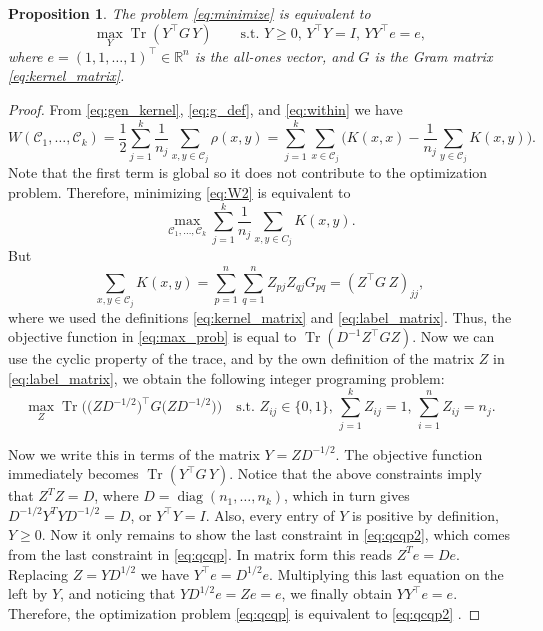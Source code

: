 \documentclass[aps,preprint,nofootinbib,floatfix]{revtex4-1}
\newtheorem{proposition}[theorem]{Proposition}
\DeclareMathOperator{\diag}{diag}
\DeclareMathOperator{\Tr}{Tr}
\newcommand\kk{K}
\newcommand\C{{\mathcal{C}}}
\newcommand\Zt{Y}
\newcommand\e{e}
\begin{document}
\begin{proposition} 
\label{th:qcqp2}
The problem \eqref{eq:minimize} is equivalent to
\begin{equation}
\label{eq:qcqp2}
\max_{\Zt} \Tr \left( \Zt^\top G \, \Zt \right)  \qquad
\mbox{s.t. $\Zt \ge 0$, $\Zt^\top \Zt = I$, 
$\Zt \Zt^\top \e = \e$},
\end{equation}
where $\e = (1,1,\dots,1)^\top \in \mathbb{R}^n$ is the all-ones vector,
and $G$ is the Gram matrix \eqref{eq:kernel_matrix}.
\end{proposition}
\begin{proof}
From 
\eqref{eq:gen_kernel},
\eqref{eq:g_def}, and
\eqref{eq:within}
we have
\begin{equation}
\label{eq:W2}
W(\C_1,\dotsc,\C_k  )
= \dfrac{1}{2} \sum_{j=1}^k \dfrac{1}{n_j} \sum_{x,y \in \C_j} \rho(x,y)
= \sum_{j=1}^k \sum_{x \in \C_j}  \bigg(
\kk(x,x) - \dfrac{1}{n_j} \sum_{y \in \C_j} \kk(x,y) \bigg).
\end{equation}
Note that the first term is global so it does not contribute to the 
optimization problem.
Therefore, minimizing \eqref{eq:W2} is equivalent to
\begin{equation}
\label{eq:max_prob}
\max_{ \C_1,\dotsc,\C_k } 
\sum_{j=1}^k \dfrac{1}{n_j} \sum_{x,y\in C_j} \kk(x,y) .
\end{equation}
But 
\begin{equation}
\sum_{x, y \in \C_j} \kk(x, y) =
\sum_{p=1}^{n} \sum_{q=1}^{n} Z_{pj} Z_{qj} G_{pq} = 
(Z^\top G \, Z)_{jj},
\end{equation}
where we used the definitions \eqref{eq:kernel_matrix} and
\eqref{eq:label_matrix}. Thus, the objective function in 
\eqref{eq:max_prob} is equal to
$\Tr \left( D^{-1} Z^\top G Z \right)$. Now we can
use the cyclic property
of the trace, and by the own definition of the matrix $Z$
in \eqref{eq:label_matrix}, we obtain the following integer
programing problem:
\begin{equation}\label{eq:qcqp}
\max_{Z} \Tr\Big( \big( Z D^{-1/2}\big)^\top G 
\big( ZD^{-1/2} \big) 
\Big) \quad
\mbox{s.t. $Z_{ij} \in \{0,1\}$, $\sum_{j=1}^k Z_{ij} = 1$, 
$\sum_{i=1}^n Z_{ij} = n_j$.}
\end{equation}

Now we write this in terms of the matrix $Y = Z D^{-1/2}$.
The objective function immediately becomes
$\Tr\left( Y^\top G \, Y\right)$. Notice that the above constraints
imply that $Z^T Z = D$, where $D=\diag(n_1,\dotsc,n_k)$, which in turn gives
$D^{-1/2} Y^T Y D^{-1/2} = D$, or $Y^\top Y = I$. 
Also, every entry of $Y$ is positive by definition,
$Y \ge 0$. Now it only remains to show the last 
constraint in \eqref{eq:qcqp2}, which comes from the last
constraint in \eqref{eq:qcqp}. In matrix form this reads
$Z^T \e = D \e$. Replacing $Z=YD^{1/2}$ we have
$Y^\top \e = D^{1/2} \e$. Multiplying this last equation
on the left by $Y$, and noticing
that $Y D^{1/2} \e = Z \e = \e$, we finally obtain
$Y Y^\top \e = \e$. Therefore, the optimization 
problem \eqref{eq:qcqp} is equivalent
to \eqref{eq:qcqp2} .
\end{proof}
\end{document}
